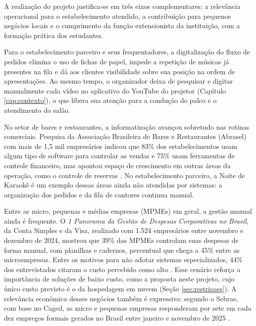 A realização do projeto justifica-se em três eixos complementares: a relevância operacional para o estabelecimento atendido, a contribuição para pequenos negócios locais e o cumprimento da função extensionista da instituição, com a formação prática dos estudantes.

Para o estabelecimento parceiro e seus frequentadores, a digitalização do fluxo de pedidos elimina o uso de fichas de papel, impede a repetição de músicas já presentes na fila e dá aos clientes visibilidade sobre sua posição na ordem de apresentações. Ao mesmo tempo, o organizador deixa de pesquisar e digitar manualmente cada vídeo no aplicativo do YouTube do projetor (Capítulo \ref{cap:contexto}), o que libera sua atenção para a condução do palco e o atendimento do salão.

No setor de bares e restaurantes, a informatização avançou sobretudo nas rotinas comerciais. Pesquisa da Associação Brasileira de Bares e Restaurantes (Abrasel) com mais de 1,5 mil empresários indicou que 83\% dos estabelecimentos usam algum tipo de software para controlar as vendas e 75\% usam ferramentas de controle financeiro, mas apontou espaço de crescimento em outras áreas da operação, como o controle de reservas \cite{jornaldocomercio2023}. No estabelecimento parceiro, a Noite de Karaokê é um exemplo dessas áreas ainda não atendidas por sistemas: a organização dos pedidos e da fila de cantores continua manual.

Entre as micro, pequenas e médias empresas (MPMEs) em geral, a gestão manual ainda é frequente. O \textit{1{\textordmasculine} Panorama da Gestão de Despesas Corporativas no Brasil}, da Conta Simples e da Visa, realizado com 1.524 empresários entre novembro e dezembro de 2024, mostrou que 39\% das MPMEs controlam suas despesas de forma manual, com planilhas e cadernos, percentual que chega a 45\% entre as microempresas. Entre os motivos para não adotar sistemas especializados, 44\% dos entrevistados citaram o custo percebido como alto \cite{folhape2025}. Esse cenário reforça a importância de soluções de baixo custo, como a proposta neste projeto, cujo único custo previsto é o da hospedagem em nuvem (Seção \ref{sec:restricoes}). A relevância econômica desses negócios também é expressiva: segundo o Sebrae, com base no Caged, as micro e pequenas empresas responderam por sete em cada dez empregos formais gerados no Brasil entre janeiro e novembro de 2025 \cite{sebrae2026}.

